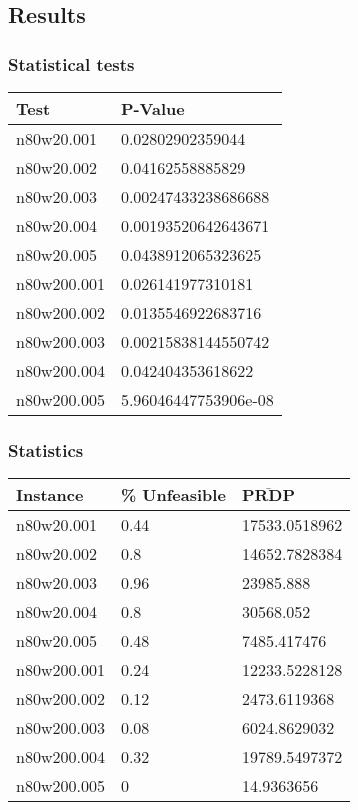 \subsection{Results} 

\subsubsection{Statistical tests}
\begin{center}
\begin{tabular}{|l|l|}
\hline
\textbf{Test} & \textbf{P-Value} \\
\hline
n80w20.001 &	0.02802902359044\\
\hline
n80w20.002 &	0.04162558885829\\
\hline
n80w20.003 &	0.00247433238686688\\
\hline
n80w20.004 &	0.00193520642643671\\
\hline
n80w20.005 &	0.0438912065323625\\
\hline
n80w200.001 &	0.026141977310181\\
\hline
n80w200.002 &	0.0135546922683716\\
\hline
n80w200.003 &	0.00215838144550742\\
\hline
n80w200.004 &	0.042404353618622\\
\hline
n80w200.005 &	5.96046447753906e-08\\
\hline
\end{tabular}
\label{tab:wilcoxon}
\end{center}

\subsubsection{Statistics}

\begin{center}
\begin{tabular}{|l|l|l|}
\hline
\textbf{Instance} & \textbf{\% Unfeasible} & $\mathbf{\bar{PRDP}}$\\
\hline
n80w20.001 &	0.44 &	17533.0518962\\
\hline
n80w20.002 &	0.8 &	14652.7828384\\
\hline
n80w20.003 &	0.96 &	23985.888\\
\hline
n80w20.004 &	0.8 &	30568.052\\
\hline
n80w20.005 &	0.48 &	7485.417476\\
\hline
n80w200.001 &	0.24 &	12233.5228128\\
\hline
n80w200.002 &	0.12 &	2473.6119368\\
\hline
n80w200.003 &	0.08 &	6024.8629032\\
\hline
n80w200.004 &	0.32 &	19789.5497372\\
\hline
n80w200.005 &	0 &	14.9363656\\
\hline
\end{tabular}
\label{tab:acostat}
\end{center}

